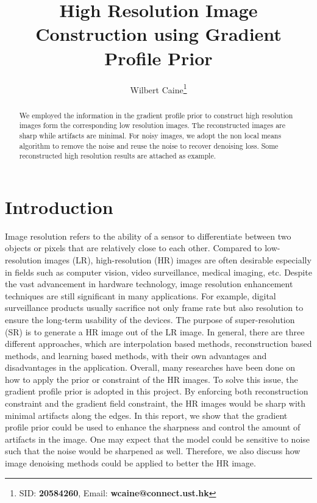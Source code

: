 \documentclass[a4paper,11pt]{article}
\title{High Resolution Image Construction using Gradient Profile Prior}
\author{
Wilbert Caine\thanks{SID: {\bf 20584260}, Email: {\bf wcaine@connect.ust.hk}}
}
\begin{document}
\thispagestyle{plain}
\maketitle


\begin{abstract}
We employed the information in the gradient profile prior to construct high resolution images form the corresponding low resolution images. The reconstructed images are sharp while artifacts are minimal. For noisy images, we adopt the non local means algorithm to remove the noise and reuse the noise to recover denoising loss. Some reconstructed high resolution results are attached as example.
\end{abstract}


\section{Introduction}

Image resolution refers to the ability of a sensor to differentiate between two objects or pixels that are relatively close to each other. Compared to low-resolution images (LR), high-resolution (HR) images are often desirable especially in fields such as computer vision, video surveillance, medical imaging, etc. Despite the vast advancement in hardware technology, image resolution enhancement techniques are still significant in many applications. For example, digital surveillance products usually sacrifice not only frame rate but also resolution to ensure the long-term usability of the devices\cite{in16}. The purpose of super-resolution (SR) is to generate a HR image out of the LR image. In general, there are three different approaches, which are interpolation based methods, reconstruction based methods, and learning based methods, with their own advantages and disadvantages in the application\cite{sr11}. Overall, many researches have been done on how to apply the prior or constraint of the HR images. To solve this issue, the gradient profile prior\cite{sr11} is adopted in this project. By enforcing both reconstruction constraint and the gradient field constraint, the HR images would be sharp with minimal artifacts along the edges. In this report, we show that the gradient profile prior could be used to enhance the sharpness and control the amount of artifacts in the image. One may expect that the model could be sensitive to noise such that the noise would be sharpened as well. Therefore, we also discuss how image denoising methods could be applied to better the HR image.
\end{document}
